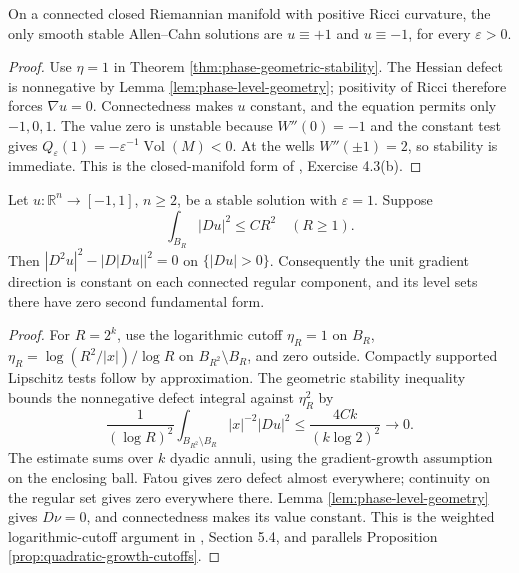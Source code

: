 \begin{corollary}\label{cor:phase-positive-ricci}
On a connected closed Riemannian manifold with positive Ricci curvature, the only smooth stable Allen--Cahn solutions are $u\equiv+1$ and $u\equiv-1$, for every $\varepsilon>0$.
\end{corollary}
\begin{proof}
Use $\eta=1$ in Theorem \ref{thm:phase-geometric-stability}. The Hessian defect is nonnegative by Lemma \ref{lem:phase-level-geometry}; positivity of Ricci therefore forces $\nabla u=0$. Connectedness makes $u$ constant, and the equation permits only $-1,0,1$. The value zero is unstable because $W''(0)=-1$ and the constant test gives $Q_\varepsilon(1)=-\varepsilon^{-1}\operatorname{Vol}(M)<0$. At the wells $W''(\pm1)=2$, so stability is immediate. This is the closed-manifold form of \cite{ChAC}, Exercise 4.3(b).
\end{proof}

\begin{proposition}\label{prop:phase-quadratic-flatness}
Let $u:\mathbb R^n\to[-1,1]$, $n\geq2$, be a stable solution with $\varepsilon=1$. Suppose
\[
 \int_{B_R}|Du|^2\leq CR^2\quad(R\geq1).
\]
Then $|D^2u|^2-|D|Du||^2=0$ on $\{|Du|>0\}$. Consequently the unit gradient direction is constant on each connected regular component, and its level sets there have zero second fundamental form.
\end{proposition}
\begin{proof}
For $R=2^k$, use the logarithmic cutoff $\eta_R=1$ on $B_R$, $\eta_R=\log(R^2/|x|)/\log R$ on $B_{R^2}\setminus B_R$, and zero outside. Compactly supported Lipschitz tests follow by approximation. The geometric stability inequality bounds the nonnegative defect integral against $\eta_R^2$ by
\[
 \frac1{(\log R)^2}\int_{B_{R^2}\setminus B_R}|x|^{-2}|Du|^2
 \leq\frac{4Ck}{(k\log2)^2}\longrightarrow0.
\]
The estimate sums over $k$ dyadic annuli, using the gradient-growth assumption on the enclosing ball. Fatou gives zero defect almost everywhere; continuity on the regular set gives zero everywhere there. Lemma \ref{lem:phase-level-geometry} gives $D\nu=0$, and connectedness makes its value constant. This is the weighted logarithmic-cutoff argument in \cite{ChAC}, Section 5.4, and parallels Proposition \ref{prop:quadratic-growth-cutoffs}.
\end{proof}

